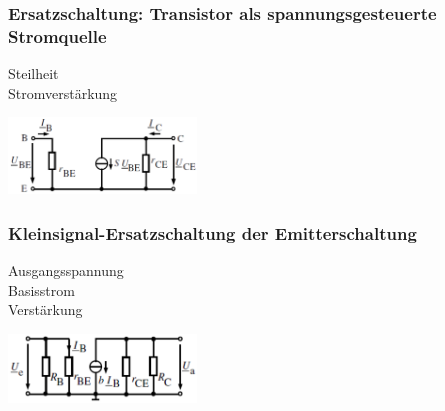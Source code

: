         \subsubsection{Ersatzschaltung: Transistor als spannungsgesteuerte Stromquelle}
            \begin{minipage}[T]{14cm}
                Steilheit
                \hspace{29.3mm}\\
                Stromverst\"arkung 
                \hspace{14.7mm}
            \end{minipage}
            \begin{minipage}[T]{5cm}
                \includegraphics[width=5cm]{./bilder/BipTraErsatzsch.png}
            \end{minipage}
            
            \subsubsection{Kleinsignal-Ersatzschaltung der Emitterschaltung}
            \begin{minipage}[T]{14cm}
                Ausgangsspannung
                \hspace{13mm}\\
                Basisstrom
                \hspace{25.3mm}\\
                Verst\"arkung
                \hspace{23.3mm}\\
            \end{minipage}
            \begin{minipage}[T]{5cm}
                \includegraphics[width=5cm]{./bilder/KleinSigErsEmmitersch.png}
            \end{minipage}
            
